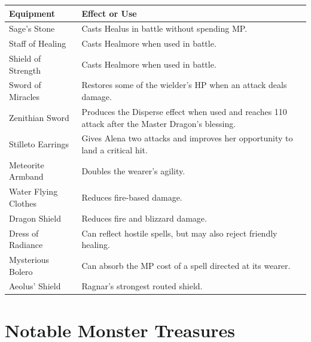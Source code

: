 \documentclass[
  american,
  10pt,
  letterpaper,
  oneside,
  open=any]{scrreprt}
\newcounter{none} %
\newenvironment{guidetable}{%
  \small\setstretch{1.0}%
  \setlength{\tabcolsep}{4pt}%
  \setlength{\LTpre}{8pt}\setlength{\LTpost}{10pt}%
  \renewcommand{\arraystretch}{1.16}%
}{ }
\begin{document}
\begin{guidetable}

{\def\LTcaptype{none} %
\begin{longtable}[]{@{}
  >{\raggedright\arraybackslash}p{}
  >{\raggedright\arraybackslash}p{}@{}}
\toprule\noalign{}
\begin{minipage}[b]{\linewidth}\raggedright
\color{GuideGreen}\bfseries Equipment
\end{minipage} & \begin{minipage}[b]{\linewidth}\raggedright
\color{GuideGreen}\bfseries Effect or Use
\end{minipage} \\
\midrule\noalign{}
\endhead
\bottomrule\noalign{}
\endlastfoot
Sage's Stone & Casts Healus in battle without spending MP. \\
Staff of Healing & Casts Healmore when used in battle. \\
Shield of Strength & Casts Healmore when used in battle. \\
Sword of Miracles & Restores some of the wielder's HP when an attack
deals damage. \\
Zenithian Sword & Produces the Disperse effect when used and reaches 110
attack after the Master Dragon's blessing. \\
Stilleto Earrings & Gives Alena two attacks and improves her opportunity
to land a critical hit. \\
Meteorite Armband & Doubles the wearer's agility. \\
Water Flying Clothes & Reduces fire-based damage. \\
Dragon Shield & Reduces fire and blizzard damage. \\
Dress of Radiance & Can reflect hostile spells, but may also reject
friendly healing. \\
Mysterious Bolero & Can absorb the MP cost of a spell directed at its
wearer. \\
Aeolus' Shield & Ragnar's strongest routed shield. \\
\end{longtable}
}

\end{guidetable}

\section{Notable Monster Treasures}\label{notable-monster-treasures}
\end{document}
